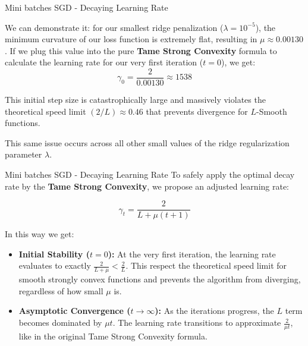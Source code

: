 \documentclass[10pt]{beamer}
\begin{document}
\begin{frame}{Mini batches SGD - Decaying Learning Rate}

    We can demonstrate it: for our smallest ridge penalization ($\lambda = 10^{-5}$), the minimum curvature of our loss function is extremely flat, resulting in $\mu \approx 0.00130$. If we plug this value into the pure \textbf{Tame Strong Convexity} formula to calculate the learning rate for our very first iteration ($t=0$), we get:
    $$\gamma_0 = \frac{2}{0.00130} \approx 1538$$

    \vspace{0.3cm}
    This initial step size is catastrophically large and massively violates the theoretical speed limit $(2/L) \approx 0.46$ that prevents divergence for $L$-Smooth functions.

    \vspace{0.3cm}
    This same issue occurs across all other small values of the ridge regularization parameter $\lambda$.
\end{frame}

\begin{frame}{Mini batches SGD - Decaying Learning Rate}
    \small
    To safely apply the optimal decay rate by the \textbf{Tame Strong Convexity}, we propose an adjusted learning rate:
    
    $$\gamma_t = \frac{2}{L + \mu(t+1)}$$

    \vspace{0.4cm}
    In this way we get:
    
    \vspace{0.2cm}
    \begin{itemize}
        \item \textbf{Initial Stability ($t=0$):} At the very first iteration, the learning rate evaluates to exactly $\frac{2}{L+\mu} < \frac{2}{L}$. This respect the theoretical speed limit for smooth strongly convex functions and prevents the algorithm from diverging, regardless of how small $\mu$ is.
        
        \vspace{0.3cm}
        \item \textbf{Asymptotic Convergence ($t \to \infty$):} As the iterations progress, the $L$ term becomes dominated by $\mu t$. The learning rate transitions to approximate $\frac{2}{\mu t}$, like in the original Tame Strong Convexity formula.
    \end{itemize}
\end{frame}
\end{document}
